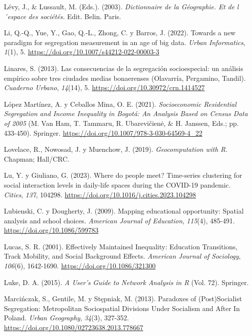 \documentclass[
  spanish,
  a4paper,%
  chapterprefix=true,%
  DIV=calc,%
  twoside]{scrbook}%
\newlength{\cslhangindent}
\newenvironment{CSLReferences}[2] %
 {\begin{list}{}{%
  \setlength{\itemindent}{0pt}
  \setlength{\leftmargin}{0pt}
  \setlength{\parsep}{0pt}
  \ifodd #1
   \setlength{\leftmargin}{\cslhangindent}
   \setlength{\itemindent}{-1\cslhangindent}
  \fi
  \setlength{\itemsep}{#2\baselineskip}}}
 {\end{list}}
\begin{document}
\begin{CSLReferences}{1}{0}
Lévy, J., \& Lussault, M. (Eds.). (2003). \emph{Dictionnaire de la Géographie. Et de l´espace des sociétés.} Edit. Belin. Paris.

Li, Q.-Q., Yue, Y., Gao, Q.-L., Zhong, C. y Barros, J. (2022). Towards a new paradigm for segregation measurement in an age of big data. \emph{Urban Informatics}, \emph{1}(1), 5. \url{https://doi.org/10.1007/s44212-022-00003-3}

Linares, S. (2013). Las consecuencias de la segregación socioespecial: un análisis empírico sobre tres ciudades medias bonaerenses (Olavarría, Pergamino, Tandil). \emph{Cuaderno Urbano}, \emph{14}(14), 5. \url{https://doi.org/10.30972/crn.1414527}

López Martínez, A. y Ceballos Mina, O. E. (2021). \emph{Socioeconomic Residential Segregation and Income Inequality in Bogotá: An Analysis Based on Census Data of 2005} (M. Van Ham, T. Tammaru, R. Ubarevičienė, \& H. Janssen, Eds.; pp. 433-450). Springer. \url{https://doi.org/10.1007/978-3-030-64569-4_22}

Lovelace, R., Nowosad, J. y Muenchow, J. (2019). \emph{Geocomputation with R}. Chapman; Hall/CRC.

Lu, Y. y Giuliano, G. (2023). Where do people meet? Time-series clustering for social interaction levels in daily-life spaces during the COVID-19 pandemic. \emph{Cities}, \emph{137}, 104298. \url{https://doi.org/10.1016/j.cities.2023.104298}

Lubienski, C. y Dougherty, J. (2009). Mapping educational opportunity: Spatial analysis and school choices. \emph{American Journal of Education}, \emph{115}(4), 485-491. \url{https://doi.org/10.1086/599783}

Lucas, S. R. (2001). Effectively Maintained Inequality: Education Transitions, Track Mobility, and Social Background Effects. \emph{American Journal of Sociology}, \emph{106}(6), 1642-1690. \url{https://doi.org/10.1086/321300}

Luke, D. A. (2015). \emph{A User's Guide to Network Analysis in R} (Vol. 72). Springer.

Marcińczak, S., Gentile, M. y Stępniak, M. (2013). Paradoxes of (Post)Socialist Segregation: Metropolitan Sociospatial Divisions Under Socialism and After In Poland. \emph{Urban Geography}, \emph{34}(3), 327-352. \url{https://doi.org/10.1080/02723638.2013.778667}


\end{CSLReferences}
\end{document}
